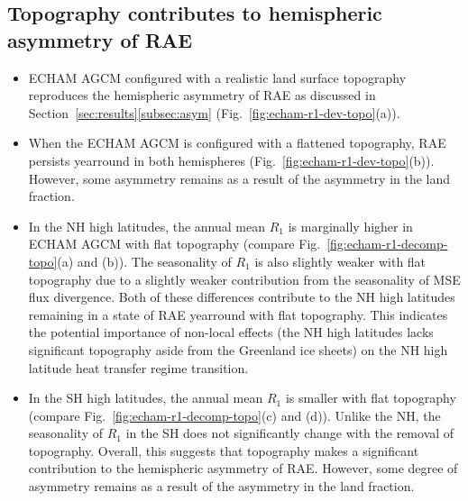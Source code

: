 \documentclass{ametsocV5}
\begin{document}
\subsection{Topography contributes to hemispheric asymmetry of RAE}
\begin{itemize}
  \item ECHAM AGCM configured with a realistic land surface topography reproduces the hemispheric asymmetry of RAE as discussed in Section~\ref{sec:results}\ref{subsec:asym} (Fig.~\ref{fig:echam-r1-dev-topo}(a)).
  \item When the ECHAM AGCM is configured with a flattened topography, RAE persists yearround in both hemispheres (Fig.~\ref{fig:echam-r1-dev-topo}(b)). However, some asymmetry remains as a result of the asymmetry in the land fraction.
  \item In the NH high latitudes, the annual mean $R_{1}$ is marginally higher in ECHAM AGCM with flat topography (compare Fig.~\ref{fig:echam-r1-decomp-topo}(a) and (b)). The seasonality of $R_{1}$ is also slightly weaker with flat topography due to a slightly weaker contribution from the seasonality of MSE flux divergence. Both of these differences contribute to the NH high latitudes remaining in a state of RAE yearround with flat topography. This indicates the potential importance of non-local effects (the NH high latitudes lacks significant topography aside from the Greenland ice sheets) on the NH high latitude heat transfer regime transition.
  \item In the SH high latitudes, the annual mean $R_{1}$ is smaller with flat topography (compare Fig.~\ref{fig:echam-r1-decomp-topo}(c) and (d)). Unlike the NH, the seasonality of $R_{1}$ in the SH does not significantly change with the removal of topography. Overall, this suggests that topography makes a significant contribution to the hemispheric asymmetry of RAE. However, some degree of asymmetry remains as a result of the asymmetry in the land fraction.

\end{itemize}
\end{document}
